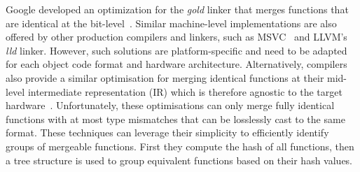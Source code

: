 Google developed an optimization for the \textit{gold} linker that merges
functions that are identical at the bit-level~\cite{tallam10,kwan12}. 
Similar machine-level implementations are also offered by other production compilers
and linkers, such as MSVC~\cite{msvc-icf} and LLVM's \textit{lld} linker.
However, such solutions are platform-specific and need to be adapted for each object code format and hardware architecture.
Alternatively, compilers also provide a similar optimisation for merging identical functions at their mid-level intermediate representation (IR) which is therefore agnostic to the target hardware~\cite{llvm-fm,livska14}.
Unfortunately, these optimisations can only merge fully identical functions with at most type mismatches that can be losslessly cast to the same format.
These techniques can leverage their simplicity to efficiently identify groups of mergeable functions.
First they compute the hash of all functions, then a tree structure is used to group equivalent functions based on their hash values.

